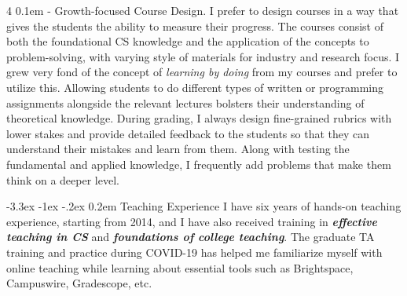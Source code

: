 \documentclass[10pt]{article}
\makeatletter
\def \section {%
    \@startsection {section}
    {1}%
    {\z@}%
    {-3.3ex \@plus -1ex \@minus -.2ex}%
    {0.2em}
    {\normalfont \Large \scshape \bfseries} %
    }
\def \paragraph {%
    \@startsection{paragraph}%
        {4}%
        \z@%
        {0.1em}
        {-\fontdimen 6 \font}%
        {\normalfont \bfseries}%
    }
\makeatother
\begin{document}
\paragraph{Growth-focused Course Design.}
I prefer to design courses in a way that gives the students the ability to measure their progress. 
%
The courses consist of both the foundational CS knowledge and the application of the concepts to problem-solving, with varying style of materials for industry and research focus.
%
I grew very fond of the concept of \textit{learning by doing} from my courses and prefer to utilize this. Allowing students to do different types of written or programming assignments alongside the relevant lectures bolsters their understanding of theoretical knowledge.
%
%
During grading, I always design fine-grained rubrics with lower stakes and provide detailed feedback to the students so that they can understand their mistakes and learn from them. Along with testing the fundamental and applied knowledge,
I frequently add problems that make them think on a deeper level. 

\section{Teaching Experience}
I have six years of hands-on teaching experience, starting from 2014, and I have also received training in \textbf{\textit{effective teaching in CS}} and \textbf{\textit{foundations of college teaching}}.
The graduate TA training and practice during COVID-19 has helped me familiarize myself with online teaching while learning about essential tools such as Brightspace, Campuswire, Gradescope, etc. 
\end{document}
